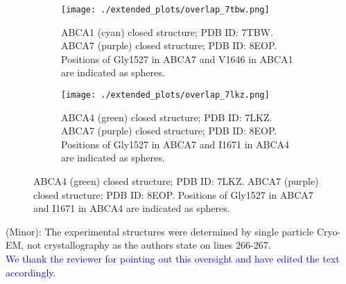 \begin{figure}[H]
	\begin{subfigure}[t]{0.45\textwidth}
		\caption{ABCA1 (cyan) closed structure; PDB ID: 7TBW. ABCA7 (purple) closed structure; PDB ID: 8EOP. Positions of Gly1527 in ABCA7 and V1646 in ABCA1 are indicated as spheres.}
		\texttt{[image: ./extended\_plots/overlap\_7tbw.png]}        
	\end{subfigure} 
	\hspace{0.5cm}
	\begin{subfigure}[t]{0.45\textwidth}
		\caption{ABCA4 (green) closed structure; PDB ID: 7LKZ. ABCA7 (purple) closed structure; PDB ID: 8EOP. Positions of Gly1527 in ABCA7 and I1671 in ABCA4 are indicated as spheres.}
		\texttt{[image: ./extended\_plots/overlap\_7lkz.png]}        
	\end{subfigure} 
\end{figure}

(Minor): The experimental structures were determined by single particle Cryo-EM, not crystallography as the authors state on lines 266-267.\\
\textcolor{blue}{We thank the reviewer for pointing out this oversight and have edited the text accordingly.}








